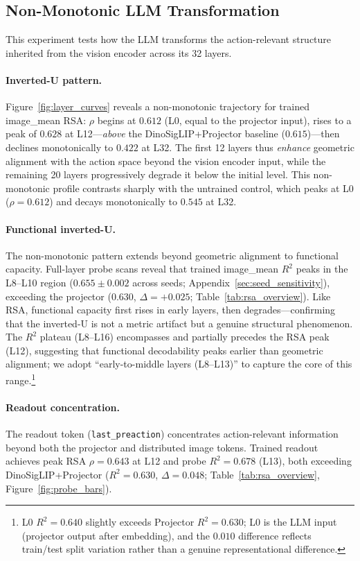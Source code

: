 \subsection{Non-Monotonic LLM Transformation}
\label{sec:llm_redistribution}

This experiment tests how the LLM transforms the action-relevant structure inherited from the vision encoder across its 32 layers.

\paragraph{Inverted-U pattern.}
Figure~\ref{fig:layer_curves} reveals a non-monotonic trajectory for trained image\_mean RSA: $\rho$ begins at $0.612$ (L0, equal to the projector input), rises to a peak of $0.628$ at L12---\emph{above} the DinoSigLIP+Projector baseline ($0.615$)---then declines monotonically to $0.422$ at L32.
The first 12 layers thus \emph{enhance} geometric alignment with the action space beyond the vision encoder input, while the remaining 20 layers progressively degrade it below the initial level.
This non-monotonic profile contrasts sharply with the untrained control, which peaks at L0 ($\rho = 0.612$) and decays monotonically to $0.545$ at L32.

\paragraph{Functional inverted-U.}
The non-monotonic pattern extends beyond geometric alignment to functional capacity.
Full-layer probe scans reveal that trained image\_mean $R^2$ peaks in the L8--L10 region ($0.655 \pm 0.002$ across seeds; Appendix~\ref{sec:seed_sensitivity}), exceeding the projector ($0.630$, $\Delta = +0.025$; Table~\ref{tab:rsa_overview}).
Like RSA, functional capacity first rises in early layers, then degrades---confirming that the inverted-U is not a metric artifact but a genuine structural phenomenon.
The $R^2$ plateau (L8--L16) encompasses and partially precedes the RSA peak (L12), suggesting that functional decodability peaks earlier than geometric alignment; we adopt ``early-to-middle layers (L8--L13)'' to capture the core of this range.\footnote{L0 $R^2 = 0.640$ slightly exceeds Projector $R^2 = 0.630$; L0 is the LLM input (projector output after embedding), and the $0.010$ difference reflects train/test split variation rather than a genuine representational difference.}

\paragraph{Readout concentration.}
The readout token (\texttt{last\_preaction}) concentrates action-relevant information beyond both the projector and distributed image tokens.
Trained readout achieves peak RSA $\rho = 0.643$ at L12 and probe $R^2 = 0.678$ (L13), both exceeding DinoSigLIP+Projector ($R^2 = 0.630$, $\Delta = 0.048$; Table~\ref{tab:rsa_overview}, Figure~\ref{fig:probe_bars}).

